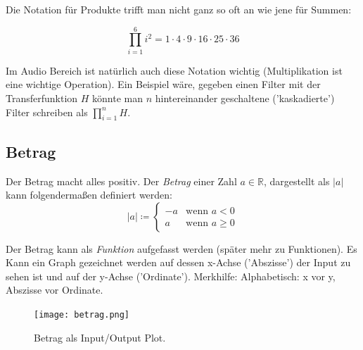 



Die Notation für Produkte trifft man nicht ganz so oft an wie jene für Summen:

\begin{equation}
{\displaystyle \prod _{i=1}^{6}i^{2} =  1\cdot 4\cdot 9\cdot 16\cdot 25\cdot 36}
\end{equation}

Im Audio Bereich ist natürlich auch diese Notation wichtig (Multiplikation ist eine wichtige Operation). Ein Beispiel wäre, gegeben einen Filter mit der Transferfunktion $H$ könnte man $n$ hintereinander geschaltene ('kaskadierte') Filter schreiben als $\prod _{i=1}^{n}H$.


\subsection{Betrag}


Der Betrag macht alles positiv. Der \emph{Betrag} einer Zahl $a \in \mathbb{R}$, dargestellt als $|a|$ kann folgendermaßen definiert werden:
$$ 
|a| \coloneqq
\begin{cases} 
-a & \text{wenn } a < 0 \\ 
a & \text{wenn } a \geq 0 
\end{cases}
$$ 

Der Betrag kann als \emph{Funktion} aufgefasst werden (später mehr zu Funktionen). Es Kann ein Graph gezeichnet werden auf dessen x-Achse ('Abszisse') der Input zu sehen ist und auf der y-Achse ('Ordinate'). Merkhilfe: Alphabetisch: x vor y, Abszisse vor Ordinate.



\begin{figure}[h!]
    \centering
    \texttt{[image: betrag.png]}
    \caption{Betrag als Input/Output Plot.}
    \label{fig:betrag}
\end{figure}

